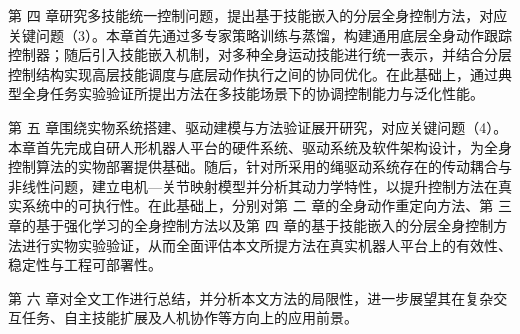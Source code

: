 第 四 章研究多技能统一控制问题，提出基于技能嵌入的分层全身控制方法，对应关键问题（3）。本章首先通过多专家策略训练与蒸馏，构建通用底层全身动作跟踪控制器；随后引入技能嵌入机制，对多种全身运动技能进行统一表示，并结合分层控制结构实现高层技能调度与底层动作执行之间的协同优化。在此基础上，通过典型全身任务实验验证所提出方法在多技能场景下的协调控制能力与泛化性能。

第 五 章围绕实物系统搭建、驱动建模与方法验证展开研究，对应关键问题（4）。本章首先完成自研人形机器人平台的硬件系统、驱动系统及软件架构设计，为全身控制算法的实物部署提供基础。随后，针对所采用的绳驱动系统存在的传动耦合与非线性问题，建立电机—关节映射模型并分析其动力学特性，以提升控制方法在真实系统中的可执行性。在此基础上，分别对第 二 章的全身动作重定向方法、第 三 章的基于强化学习的全身控制方法以及第 四 章的基于技能嵌入的分层全身控制方法进行实物实验验证，从而全面评估本文所提方法在真实机器人平台上的有效性、稳定性与工程可部署性。


第 六 章对全文工作进行总结，并分析本文方法的局限性，进一步展望其在复杂交互任务、自主技能扩展及人机协作等方向上的应用前景。



